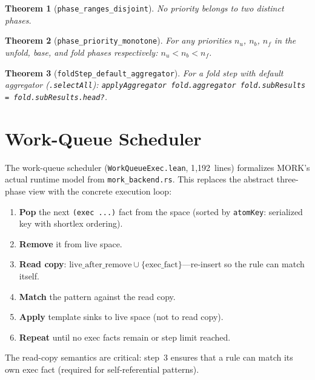 \documentclass[11pt]{article}
\newtheorem{theorem}{Theorem}[section]
\theoremstyle{definition}
\theoremstyle{remark}
\newcommand{\MORK}{\textup{MORK}}
\begin{document}
\begin{theorem}[\texttt{phase\_ranges\_disjoint}]
No priority belongs to two distinct phases.
\end{theorem}

\begin{theorem}[\texttt{phase\_priority\_monotone}]
For any priorities $n_u$, $n_b$, $n_f$ in the unfold, base, and fold
phases respectively: $n_u < n_b < n_f$.
\end{theorem}

\begin{theorem}[\texttt{foldStep\_default\_aggregator}]
For a fold step with default aggregator (\texttt{.selectAll}):
\texttt{applyAggregator fold.aggregator fold.subResults =
fold.subResults.head?}.
\end{theorem}

\section{Work-Queue Scheduler}
\label{sec:workqueue}

The work-queue scheduler (\texttt{WorkQueueExec.lean}, 1{,}192~lines)
formalizes \MORK{}'s actual runtime model from \texttt{mork\_backend.rs}.
This replaces the abstract three-phase view with the concrete execution
loop:

\begin{enumerate}[nosep]
\item \textbf{Pop} the next \texttt{(exec ...)} fact from the space
  (sorted by \texttt{atomKey}: serialized key with shortlex ordering).
\item \textbf{Remove} it from live space.
\item \textbf{Read copy}: $\mathrm{live\_after\_remove} \cup
  \{\mathrm{exec\_fact}\}$---re-insert so the rule can match itself.
\item \textbf{Match} the pattern against the read copy.
\item \textbf{Apply} template sinks to live space (not to read copy).
\item \textbf{Repeat} until no exec facts remain or step limit reached.
\end{enumerate}

\noindent
The read-copy semantics are critical: step~3 ensures that a rule can
match its own exec fact (required for self-referential patterns).
\end{document}
